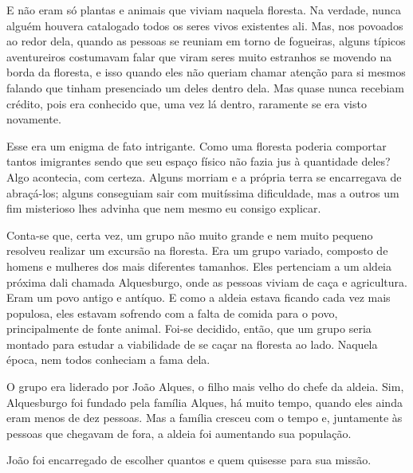 E não eram só plantas e animais que viviam naquela floresta. Na verdade, nunca alguém houvera catalogado todos os seres vivos existentes ali. Mas, nos povoados ao redor dela, quando as pessoas se reuniam em torno de fogueiras, alguns típicos aventureiros costumavam falar que viram seres muito estranhos se movendo na borda da floresta, e isso quando eles não queriam chamar atenção para si mesmos falando que tinham presenciado um deles dentro dela. Mas quase nunca recebiam crédito, pois era conhecido que, uma vez lá dentro, raramente se era visto novamente.

Esse era um enigma de fato intrigante. Como uma floresta poderia comportar tantos imigrantes sendo que seu espaço físico não fazia jus à quantidade deles? Algo acontecia, com certeza. Alguns morriam e a própria terra se encarregava de abraçá-los; alguns conseguiam sair com muitíssima dificuldade, mas a outros um fim misterioso lhes advinha que nem mesmo eu consigo explicar.

Conta-se que, certa vez, um grupo não muito grande e nem muito pequeno resolveu realizar um excursão na floresta. Era um grupo variado, composto de homens e mulheres dos mais diferentes tamanhos. Eles pertenciam a um aldeia próxima dali chamada Alquesburgo, onde as pessoas viviam de caça e agricultura. Eram um povo antigo e antíquo. E como a aldeia estava ficando cada vez mais populosa, eles estavam sofrendo com a falta de comida para o povo, principalmente de fonte animal. Foi-se decidido, então, que um grupo seria montado para estudar a viabilidade de se caçar na floresta ao lado. Naquela época, nem todos conheciam a fama dela.

O grupo era liderado por João Alques, o filho mais velho do chefe da aldeia. Sim, Alquesburgo foi fundado pela família Alques, há muito tempo, quando eles ainda eram menos de dez pessoas. Mas a família cresceu com o tempo e, juntamente às pessoas que chegavam de fora, a aldeia foi aumentando sua população.

João foi encarregado de escolher quantos e quem quisesse para sua missão.